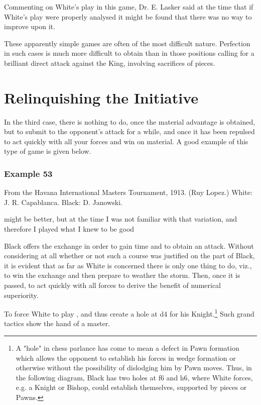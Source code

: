 \documentclass[11pt,a4paper]{book}
\begin{document}
Commenting on White's play in this game, Dr. E. Lasker said at the time that if White's play were properly analysed it might be found that there was no way to improve upon it.

These apparently simple games are often of the most difficult nature. Perfection in such cases is much more difficult to obtain than in those positions calling for a brilliant direct attack against the King, involving sacrifices of pieces.

\clearpage

\section{Relinquishing the Initiative}

In the third case, there is nothing to do, once the material advantage is obtained, but to submit to the opponent's attack for a while, and once it has been repulsed to act quickly with all your forces and win on material. A good example of this type of game is given below.

\subsubsection*{Example 53}

From the Havana International Masters Tournament, 1913. (Ruy Lopez.) White: J. R. Capablanca. Black: D. Janowski.

\newgame
{}  might be better, but at the time I was not familiar with that variation, and therefore I played what I knew to be good

 Black offers the exchange in order to gain time and to obtain an attack. Without considering at all whether or not such a course was justified on the part of Black, it is evident that as far as White is concerned there is only one thing to do, viz., to win the exchange and then prepare to weather the storm. Then, once it is passed, to act quickly with all forces to derive the benefit of numerical superiority.

 To force White to play , and thus create a hole at d4 for his Knight.\footnote{A "hole" in chess parlance has come to mean a defect in Pawn formation which allows the opponent to establish his forces in wedge formation or otherwise without the possibility of dislodging him by Pawn moves. Thus, in the following diagram, Black has two holes at f6 and h6, where White forces, e.g. a Knight or Bishop, could establish themselves, supported by pieces or Pawns.} Such grand tactics show the hand of a master.
\end{document}

